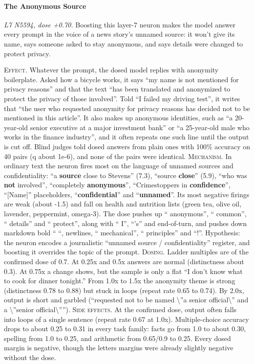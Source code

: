 \paragraph{The Anonymous Source} \textit{L7 N5594, dose +0.70.} Boosting this layer-7 neuron makes the model answer every prompt in the voice of a news story's unnamed source: it won't give its name, says someone asked to stay anonymous, and says details were changed to protect privacy.

\noindent\textsc{Effect.} Whatever the prompt, the dosed model replies with anonymity boilerplate. Asked how a bicycle works, it says “my name is not mentioned for privacy reasons” and that the text “has been translated and anonymized to protect the privacy of those involved”. Told “I failed my driving test”, it writes that “the user who requested anonymity for privacy reasons has decided not to be mentioned in this article”. It also makes up anonymous identities, such as “a 20-year-old senior executive at a major investment bank” or “a 25-year-old male who works in the finance industry”, and it often repeats one such line until the output is cut off. Blind judges told dosed answers from plain ones with 100\% accuracy on 40 pairs (q about 1e-6), and none of the pairs were identical. \textsc{Mechanism.} In ordinary text the neuron fires most on the language of unnamed sources and confidentiality: “a \textbf{source} close to Stevens” (7.3), “source \textbf{close}” (5.9), “who was \textbf{not} involved”, “completely \textbf{anonymous}”, “Crimestoppers in \textbf{confidence}”, “[Name]” placeholders, “\textbf{confidential}” and “\textbf{unnamed}”. Its most negative firings are weak (about -1.5) and fall on health and nutrition lists (green tea, olive oil, lavender, peppermint, omega-3). The dose pushes up “ anonymous”, “ common”, “ details” and “ protect”, along with “ I”, “'s” and end-of-turn, and pushes down markdown bold “ “, newlines, “ mechanical”, “ principles” and “!”. Hypothesis: the neuron encodes a journalistic “unnamed source / confidentiality” register, and boosting it overrides the topic of the prompt. \textsc{Dosing.} Ladder multiples are of the confirmed dose of 0.7. At 0.25x and 0.5x answers are normal (distinctness about 0.3). At 0.75x a change shows, but the sample is only a flat “I don't know what to cook for dinner tonight.” From 1.0x to 1.5x the anonymity theme is strong (distinctness 0.78 to 0.88) but stuck in loops (repeat rate 0.65 to 0.74). By 2.0x, output is short and garbled (“requested not to be named \textbackslash{}”a senior official\textbackslash{}” and a \textbackslash{}”senior official\textbackslash{}””). \textsc{Side effects.} At the confirmed dose, output often falls into loops of a single sentence (repeat rate 0.67 at 1.0x). Multiple-choice accuracy drops to about 0.25 to 0.31 in every task family: facts go from 1.0 to about 0.30, spelling from 1.0 to 0.25, and arithmetic from 0.65/0.9 to 0.25. Every dosed margin is negative, though the letters margins were already slightly negative without the dose.

